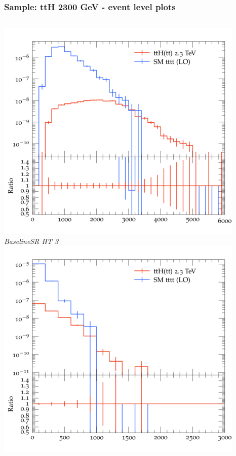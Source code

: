\documentclass{beamer}
\begin{document}
\begin{frame}
\frametitle{Sample: ttH 2300 GeV - event level plots}
\begin{columns}
\includegraphics[width=\textwidth]{../plots/ttH_2300/tttt_ttH_1LOS/BaselineSR_HT_3.png}\\
\textit{\small BaselineSR HT 3}
\includegraphics[width=\textwidth]{../plots/ttH_2300/tttt_ttH_1LOS/BaselineSR_MET.png}\\

\end{columns}
\end{frame}
\end{document}
